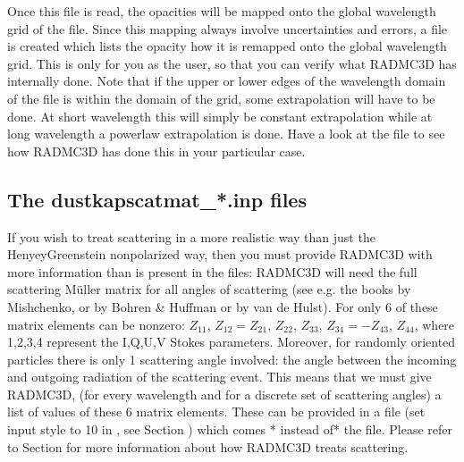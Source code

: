 \documentclass[letterpaper,10pt,english]{sphinxmanual}
\begin{document}
Once this file is read, the opacities will be mapped onto the global
wavelength grid of the  file. Since this mapping
always involve uncertainties and errors, a file  is created which lists the opacity how it
is remapped onto the global wavelength grid. This is only for you as the
user, so that you can verify what RADMC\sphinxhyphen{}3D has internally done. Note that if
the upper or lower edges of the wavelength domain of the  file is within the domain of the  grid, some extrapolation will have to be done.  At
short wavelength this will simply be constant extrapolation while at long
wavelength a powerlaw extrapolation is done. Have a look at the  file to see how RADMC\sphinxhyphen{}3D has done this
in your particular case.


\subsection{The dustkapscatmat\_*.inp files}
\label{\detokenize{inputoutputfiles:the-dustkapscatmat-inp-files}}\label{\detokenize{inputoutputfiles:sec-dustkapscatmat-files}}
If you wish to treat scattering in a more realistic way than just the
Henyey\sphinxhyphen{}Greenstein non\sphinxhyphen{}polarized way, then you must provide RADMC\sphinxhyphen{}3D with
more information than is present in the 
files: RADMC\sphinxhyphen{}3D will need the full scattering Müller matrix for all angles
of scattering (see e.g. the books by Mishchenko, or by Bohren \& Huffman or
by van de Hulst). For  only 6 of these
matrix elements can be non\sphinxhyphen{}zero: \(Z_{11}\), \(Z_{12}=Z_{21}\), \(Z_{22}\),
\(Z_{33}\), \(Z_{34}=-Z_{43}\), \(Z_{44}\), where 1,2,3,4 represent the I,Q,U,V
Stokes parameters. Moreover, for randomly oriented particles there is only 1
scattering angle involved: the angle between the incoming and outgoing
radiation of the scattering event. This means that we must give RADMC\sphinxhyphen{}3D,
(for every wavelength and for a discrete set of scattering angles) a list of
values of these 6 matrix elements. These can be provided in a file
 (set input style to 10 in , see Section {\hyperref[\detokenize{inputoutputfiles:sec-dustopac-inp-file}]{}}) which comes *  instead of* the  file. Please refer to
Section {\hyperref[\detokenize{dustradtrans:sec-scattering}]{}} for more information about how RADMC\sphinxhyphen{}3D treats
scattering.
\end{document}
